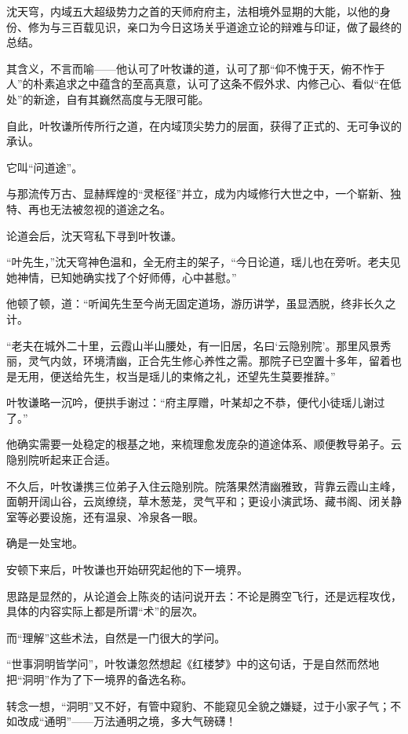 沈天穹，内域五大超级势力之首的天师府府主，法相境外显期的大能，以他的身份、修为与三百载见识，亲口为今日这场关乎道途立论的辩难与印证，做了最终的总结。

其含义，不言而喻——他认可了叶牧谦的道，认可了那“仰不愧于天，俯不怍于人”的朴素追求之中蕴含的至高真意，认可了这条不假外求、内修己心、看似“在低处”的新途，自有其巍然高度与无限可能。

自此，叶牧谦所传所行之道，在内域顶尖势力的层面，获得了正式的、无可争议的承认。

它叫“问道途”。

与那流传万古、显赫辉煌的“灵枢径”并立，成为内域修行大世之中，一个崭新、独特、再也无法被忽视的道途之名。

\vspace{2em}

论道会后，沈天穹私下寻到叶牧谦。

“叶先生，”沈天穹神色温和，全无府主的架子，“今日论道，瑶儿也在旁听。老夫见她神情，已知她确实找了个好师傅，心中甚慰。”

他顿了顿，道：“听闻先生至今尚无固定道场，游历讲学，虽显洒脱，终非长久之计。

“老夫在城外二十里，云霞山半山腰处，有一旧居，名曰‘云隐别院’。那里风景秀丽，灵气内敛，环境清幽，正合先生修心养性之需。那院子已空置十多年，留着也是无用，便送给先生，权当是瑶儿的束脩之礼，还望先生莫要推辞。”

叶牧谦略一沉吟，便拱手谢过：“府主厚赠，叶某却之不恭，便代小徒瑶儿谢过了。”

他确实需要一处稳定的根基之地，来梳理愈发庞杂的道途体系、顺便教导弟子。云隐别院听起来正合适。

不久后，叶牧谦携三位弟子入住云隐别院。院落果然清幽雅致，背靠云霞山主峰，面朝开阔山谷，云岚缭绕，草木葱茏，灵气平和；更设小演武场、藏书阁、闭关静室等必要设施，还有温泉、冷泉各一眼。

确是一处宝地。

\vspace{2em}

安顿下来后，叶牧谦也开始研究起他的下一境界。

思路是显然的，从论道会上陈炎的诘问说开去：不论是腾空飞行，还是远程攻伐，具体的内容实际上都是所谓“术”的层次。

而“理解”这些术法，自然是一门很大的学问。

“世事洞明皆学问”，叶牧谦忽然想起《红楼梦》中的这句话，于是自然而然地把“洞明”作为了下一境界的备选名称。

转念一想，“洞明”又不好，有管中窥豹、不能窥见全貌之嫌疑，过于小家子气；不如改成“通明”——万法通明之境，多大气磅礴！

